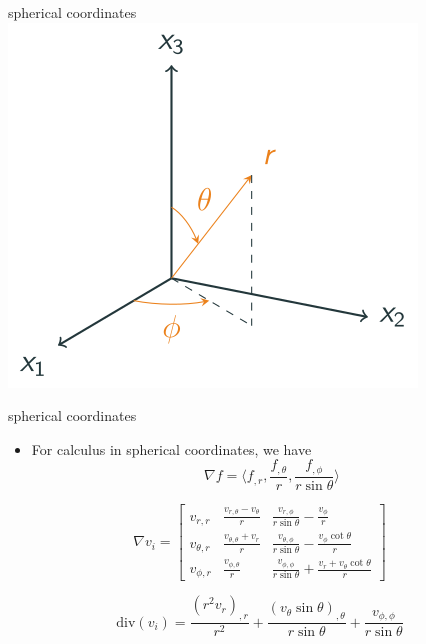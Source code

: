 \begin{frame}{spherical coordinates}
\protect\hypertarget{spherical-coordinates}{}
\includegraphics{../images/spheriical.svg}
\end{frame}

\begin{frame}{spherical coordinates}
\protect\hypertarget{spherical-coordinates-1}{}
\begin{itemize}
\tightlist
\item
  For calculus in spherical coordinates, we have
  \[\nabla f = \langle f_{,r}, \frac{f_{,\theta}}{r}, \frac{f_{,\phi}}{r \sin \theta} \rangle\]
\end{itemize}

\[\nabla v_i = \begin{bmatrix}
    v_{r,r} & \frac{v_{r,\theta}-v_\theta}{r} & \frac{v_{r,\phi}}{r \sin \theta} - \frac{v_\phi}{r}\\
    v_{\theta,r} & \frac{v_{\theta,\theta}+v_r}{r} & \frac{v_{\theta,\phi}}{r \sin \theta} - \frac{v_\phi \cot \theta}{r}\\
    v_{\phi,r} & \frac{v_{\phi,\theta}}{r} & \frac{v_{\phi,\phi}}{r\sin \theta} + \frac{v_r + v_\theta \cot \theta}{r}
\end{bmatrix}\]

\[\text{div} ( v_i) = \frac{(r^2v_r)_{,r}}{r^2} + \frac{(v_\theta \sin \theta)_{,\theta}}{r\sin \theta} + \frac{v_{\phi,\phi}}{r\sin\theta}\]
\end{frame}


